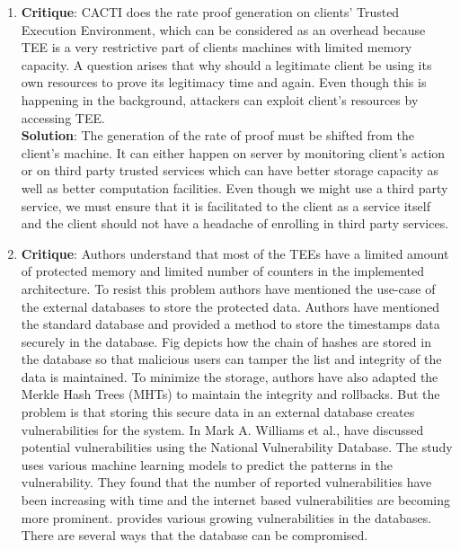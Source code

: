 \begin{enumerate}
	\item \textbf{Critique}: CACTI does the rate proof generation on clients' Trusted Execution Environment, which can be considered as an overhead because TEE is a very restrictive part of clients machines with limited memory capacity. A question arises that why should a legitimate client be using its own resources to prove its legitimacy time and again. Even though this is happening in the background, attackers can exploit client’s resources by accessing TEE.\\

	\textbf{Solution}: The generation of the rate of proof must be shifted from the client's machine. It can either happen on server by monitoring client’s action or on third party trusted services which can have better storage capacity as well as better computation facilities. Even though we might use a third party service, we must ensure that it is facilitated to the client as a service itself and the client should not have a headache of enrolling in third party services.\\

	\item \textbf{Critique}: Authors understand that most of the TEEs have a limited amount of protected memory and limited number of counters in the implemented architecture. To resist this problem authors have mentioned the use-case of the external databases to store the protected data. Authors have mentioned the standard database and provided a method to store the timestamps data securely in the database. Fig depicts how the chain of hashes are stored in the database so that malicious users can tamper the list and integrity of the data is maintained.
	To minimize the storage, authors have also adapted the Merkle Hash Trees (MHTs) to maintain the integrity and rollbacks. But the problem is that storing this secure data in an external database creates vulnerabilities for the system. In \cite{ref3} Mark A. Williams et al., have discussed potential vulnerabilities using the National Vulnerability Database. The study uses various machine learning models to predict the patterns in the vulnerability. They found that the number of reported vulnerabilities have been increasing with time and the internet based vulnerabilities are becoming more prominent. \cite{url1} provides various growing vulnerabilities in the databases. There are several ways that the database can be compromised.


\end{enumerate}

